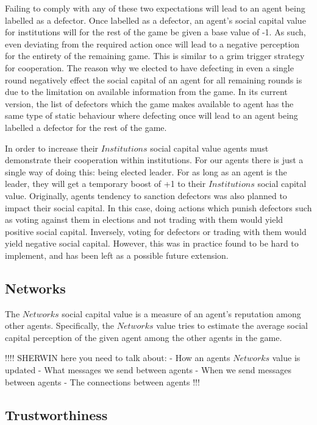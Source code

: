 Failing to comply with any of these two expectations will lead to an agent being labelled as a defector. Once labelled as a defector, an agent's social capital value for institutions will for the rest of the game be given a base value of -1. As such, even deviating from the required action once will lead to a negative perception for the entirety of the remaining game. This is similar to a grim trigger strategy for cooperation. The reason why we elected to have defecting in even a single round negatively effect the social capital of an agent for all remaining rounds is due to the limitation on available information from the game. In its current version, the list of defectors which the game makes available to agent has the same type of static behaviour where defecting once will lead to an agent being labelled a defector for the rest of the game.

In order to increase their $Institutions$ social capital value agents must demonstrate their cooperation within institutions. For our agents there is just a single way of doing this: being elected leader. For as long as an agent is the leader, they will get a temporary boost of +1 to their $Institutions$ social capital value. Originally, agents tendency to sanction defectors was also planned to impact their social capital. In this case, doing actions which punish defectors such as voting against them in elections and not trading with them would yield positive social capital. Inversely, voting for defectors or trading with them would yield negative social capital. However, this was in practice found to be hard to implement, and has been left as a possible future extension.

\subsection{Networks}

The $Networks$ social capital value is a measure of an agent's reputation among other agents. Specifically, the $Networks$ value tries to estimate the average social capital perception of the given agent among the other agents in the game. 

 !!!!
SHERWIN here you need to talk about:
- How an agents $Networks$ value is updated
- What messages we send between agents
- When we send messages between agents
- The connections between agents
 !!!

\subsection{Trustworthiness}


